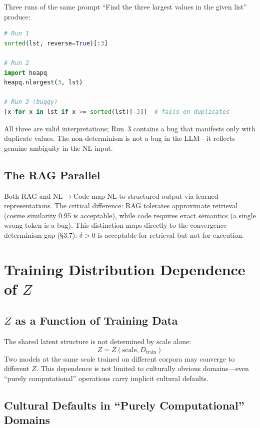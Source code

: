 \documentclass[11pt]{article}
\theoremstyle{definition}
\newcommand{\Dtrain}{D_{\text{train}}}
\begin{document}
Three runs of the same prompt ``Find the three largest values in the given list'' produce:

\begin{lstlisting}[language=Python]
# Run 1
sorted(lst, reverse=True)[:3]

# Run 2
import heapq
heapq.nlargest(3, lst)

# Run 3 (buggy)
[x for x in lst if x >= sorted(lst)[-3]]  # fails on duplicates
\end{lstlisting}

All three are valid interpretations; Run~3 contains a bug that manifests only with duplicate values. The non-determinism is not a bug in the LLM---it reflects genuine ambiguity in the NL input.

\subsection{The RAG Parallel}

Both RAG and NL$\to$Code map NL to structured output via learned representations. The critical difference: RAG tolerates approximate retrieval (cosine similarity 0.95 is acceptable), while code requires exact semantics (a single wrong token is a bug). This distinction maps directly to the convergence-determinism gap (\S3.7): $\delta > 0$ is acceptable for retrieval but not for execution.

\section{Training Distribution Dependence of $Z$}\label{app:dtrain}

\subsection{$Z$ as a Function of Training Data}

The shared latent structure is not determined by scale alone:
\[
Z = Z(\text{scale}, \Dtrain)
\]
Two models at the same scale trained on different corpora may converge to different $Z$. This dependence is not limited to culturally obvious domains---even ``purely computational'' operations carry implicit cultural defaults.

\subsection{Cultural Defaults in ``Purely Computational'' Domains}
\end{document}

